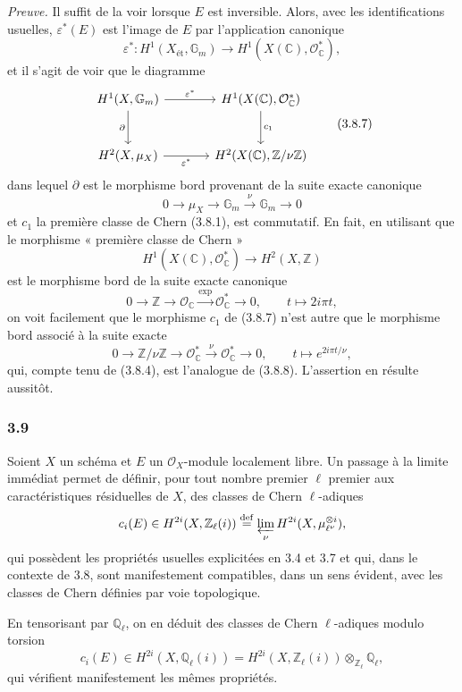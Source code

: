 \documentclass[11pt]{article}
\begin{document}
\emph{Preuve.} Il suffit de la voir lorsque $E$ est inversible. Alors, avec les identifications usuelles, $\varepsilon^*(E)$ est l'image de $E$ par l'application canonique
\[
\varepsilon^*:H^1(X_{\mathrm{ét}},\mathbb G_m)\to H^1(X(\mathbb C),\mathcal O_\mathbb C^*),
\tag{3.8.6}
\]
et il s'agit de voir que le diagramme
\[
\begin{tikzcd}[column sep=large,row sep=large]
H^1(X,\mathbb G_m) \arrow[r,"\varepsilon^*"] \arrow[d,"\partial"'] &
H^1(X(\mathbb C),\mathcal O_\mathbb C^*) \arrow[d,"c_1"]\\
H^2(X,\mu_X) \arrow[r,"\varepsilon^*"'] &
H^2(X(\mathbb C),\mathbb Z/\nu\mathbb Z)
\end{tikzcd}
\tag{3.8.7}
\]
dans lequel $\partial$ est le morphisme bord provenant de la suite exacte canonique
\[
0\to \mu_X\to\mathbb G_m\xrightarrow{\nu}\mathbb G_m\to0
\tag{3.8.8}
\]
et $c_1$ la première classe de Chern (3.8.1), est commutatif. En fait, en utilisant que le morphisme « première classe de Chern »
\[
H^1(X(\mathbb C),\mathcal O_\mathbb C^*)\to H^2(X,\mathbb Z)
\]
est le morphisme bord de la suite exacte canonique
\[
0\to\mathbb Z\to\mathcal O_\mathbb C\xrightarrow{\exp}\mathcal O_\mathbb C^*\to0,
\qquad
t\mapsto 2i\pi t,
\]
on voit facilement que le morphisme $c_1$ de (3.8.7) n'est autre que le morphisme bord associé à la suite exacte
\[
0\to\mathbb Z/\nu\mathbb Z\to\mathcal O_\mathbb C^*\xrightarrow{\nu}\mathcal O_\mathbb C^*\to0,
\qquad
t\mapsto e^{2i\pi t/\nu},
\]
qui, compte tenu de (3.8.4), est l'analogue de (3.8.8). L'assertion en résulte aussitôt.

\subsubsection*{3.9}
Soient $X$ un schéma et $E$ un $\mathcal O_X$-module localement libre. Un passage à la limite immédiat permet de définir, pour tout nombre premier $\ell$ premier aux caractéristiques résiduelles de $X$, des classes de Chern $\ell$-adiques
\[
c_i(E)\in H^{2i}(X,\mathbb Z_\ell(i))
\stackrel{\mathrm{def}}{=}\varprojlim_\nu H^{2i}(X,\mu_{\ell^\nu}^{\otimes i}),
\]
qui possèdent les propriétés usuelles explicitées en 3.4 et 3.7 et qui, dans le contexte de 3.8, sont manifestement compatibles, dans un sens évident, avec les classes de Chern définies par voie topologique.

En tensorisant par $\mathbb Q_\ell$, on en déduit des classes de Chern $\ell$-adiques modulo torsion
\[
c_i(E)\in H^{2i}(X,\mathbb Q_\ell(i))
=H^{2i}(X,\mathbb Z_\ell(i))\otimes_{\mathbb Z_\ell}\mathbb Q_\ell,
\]
qui vérifient manifestement les mêmes propriétés.
\end{document}
